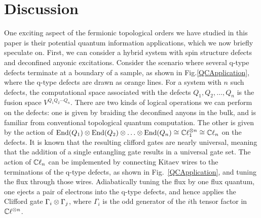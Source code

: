 


\section{Discussion} \label{discussion}

One exciting aspect of the fermionic topological orders we have studied in this paper is their potential quantum information 
applications, which we now briefly speculate on. 
First, we can consider a hybrid system with spin structure defects and deconfined anyonic excitations.
Consider the scenario where several q-type defects terminate at a boundary of a sample, as shown in Fig.\ref{QCApplication}, where the q-type defects are drawn as orange lines.
For a system with $n$ such defects,  
the computational space associated with the defects $Q_1,Q_2,\dots,Q_n$ is the fusion space $V^{Q_1 Q_2 \cdots Q_n}$. 
There are two kinds of logical operations we can perform on the defects:
one is given by braiding the deconfined anyons in the bulk, and is familiar from conventional topological quantum computation.
The other is given by the action of $\End(Q_1)\tp\End(Q_2)\tp\dots\tp\End(Q_n)\cong\cliff_1^{\tp n} \cong \cliff_n$ on the defects.
It is known that the resulting clifford gates are nearly universal, meaning that the addition of a single entangling gate results in a universal gate set.
The action of $\mathbb{C}\ell_n$ can be implemented by connecting Kitaev wires to the terminations of the q-type defects, as shown in Fig.~\ref{QCApplication}, and tuning the flux through those wires. 
Adiabatically tuning the flux by one flux quantum, one ejects a pair of electrons into the q-type defects, and hence applies the Clifford gate $\Gamma_i \otimes \Gamma_j$, where $\Gamma_i$ is the odd generator 
of the $i$th tensor factor in $\mathbb{C}\ell^{\otimes n}$.

